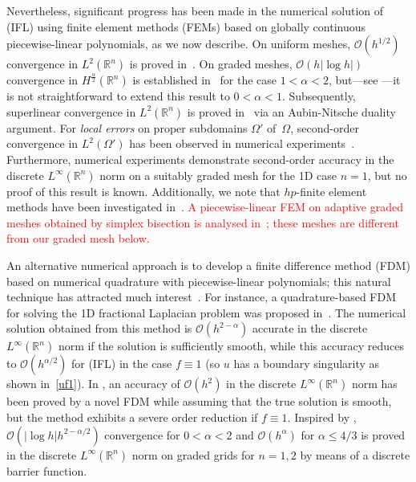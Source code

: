 \documentclass[smallextended]{svjour3}       %
\newcommand{\tcr}[1]{\textcolor{red}{#1}}
\begin{document}
Nevertheless, significant progress has been made in the numerical solution of (IFL) using finite element methods (FEMs) based on 
globally continuous piecewise-linear polynomials, as we now describe.
On uniform meshes, $\mathcal{O}\left(h^{1/2}\right)$ convergence in $L^2(\mathbb{R}^{n})$ is proved in~\cite{D'Elia:13}.
On graded meshes, $\mathcal{O}\left(h|\log h|\right)$ convergence in $H^{\frac{\alpha}{2}}(\mathbb{R}^{n})$    is established in~\cite{Acosta:17} for the case $1<\alpha<2$, but---see \cite[Remark~4.13]{Acosta:17}---it is not straightforward to extend this result to $0<\alpha<1$.
Subsequently, superlinear convergence in $L^2(\mathbb{R}^{n})$  is proved  in~\cite{BLN:21} via an Aubin-Nitsche duality argument. 
For \emph{local errors} on proper subdomains $\Omega'$ of~$\Omega$, second-order convergence in $L^2(\Omega')$  has been  observed  in numerical experiments~\cite{FKM:22}.
Furthermore, numerical experiments \cite{CSW:21}  demonstrate second-order accuracy in the discrete $L^\infty(\mathbb{R}^{n})$ norm  on a suitably graded mesh for the 1D case $n=1$, but no proof of this result is known.
Additionally, we note that $hp$-finite element methods have been investigated in~\cite{FMMS22,FMM22,FM21}. 
\tcr{A piecewise-linear FEM on adaptive graded meshes obtained by simplex bisection is analysed in~\cite{BN:23}; these meshes are different from our graded mesh below.}

An alternative numerical approach is to develop a finite difference method (FDM) based on numerical quadrature with piecewise-linear polynomials; this natural technique has attracted much interest~\cite{HW:22,HuangO:14}.
For instance, a quadrature-based FDM for solving the 1D fractional Laplacian problem was proposed in~\cite{HuangO:14}. 
The numerical solution obtained from this method is $\mathcal{O}\left(h^{2-\alpha}\right)$ accurate in the 
discrete $L^\infty(\mathbb{R}^{n})$ norm if the solution is  sufficiently smooth, 
while this accuracy reduces to  $\mathcal{O}\left(h^{\alpha/2}\right)$ for (IFL) 
in the case $f\equiv 1$ (so $u$ has a boundary singularity as shown in~\eqref{uf1}).
In \cite{DHZ:18}, an accuracy of  $\mathcal{O}\left(h^{2}\right)$  in the discrete $L^\infty(\mathbb{R}^{n})$ norm has been proved 
by a novel FDM  while assuming that the true solution is smooth, but the method exhibits a  severe order reduction if  $f\equiv 1$. 
 Inspired by \cite{HuangO:14},  $\mathcal{O}\left(|\log h|h^{2-\alpha/2}\right)$ convergence  for $0<\alpha<2$ and  $\mathcal{O}\left(h^{\alpha}\right)$ for $\alpha\leq 4/3$ is proved  \cite{HW:22} in the discrete $L^{\infty}(\mathbb{R}^{n})$ norm on graded grids for $n=1,2$ by means of a discrete barrier function.
	
\end{document}
